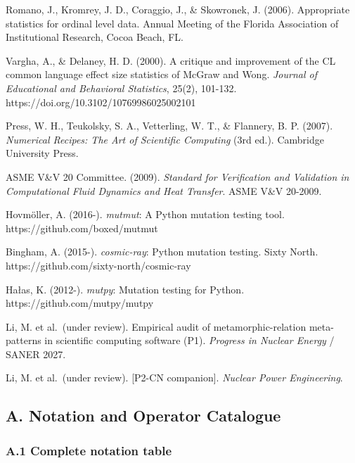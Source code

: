 \documentclass[review,12pt,authoryear]{elsarticle}
\begin{document}
Romano, J., Kromrey, J. D., Coraggio, J., \& Skowronek, J. (2006).
Appropriate statistics for ordinal level data. Annual Meeting of the
Florida Association of Institutional Research, Cocoa Beach, FL.

Vargha, A., \& Delaney, H. D. (2000). A critique and improvement of the
CL common language effect size statistics of McGraw and Wong.
\emph{Journal of Educational and Behavioral Statistics}, 25(2), 101-132.
https://doi.org/10.3102/10769986025002101

Press, W. H., Teukolsky, S. A., Vetterling, W. T., \& Flannery, B. P.
(2007). \emph{Numerical Recipes: The Art of Scientific Computing} (3rd
ed.). Cambridge University Press.

ASME V\&V 20 Committee. (2009). \emph{Standard for Verification and
Validation in Computational Fluid Dynamics and Heat Transfer}. ASME V\&V
20-2009.

Hovmöller, A. (2016-). \emph{mutmut}: A Python mutation testing tool.
https://github.com/boxed/mutmut

Bingham, A. (2015-). \emph{cosmic-ray}: Python mutation testing. Sixty
North. https://github.com/sixty-north/cosmic-ray

Hałas, K. (2012-). \emph{mutpy}: Mutation testing for Python.
https://github.com/mutpy/mutpy

Li, M. et al.~(under review). Empirical audit of metamorphic-relation
meta-patterns in scientific computing software (P1). \emph{Progress in
Nuclear Energy} / SANER 2027.

Li, M. et al.~(under review). {[}P2-CN companion{]}. \emph{Nuclear Power
Engineering}.

\appendix

\subsection{A. Notation and Operator
Catalogue}\label{a.-notation-and-operator-catalogue}

\subsubsection{A.1 Complete notation
table}\label{a.1-complete-notation-table}
\end{document}
